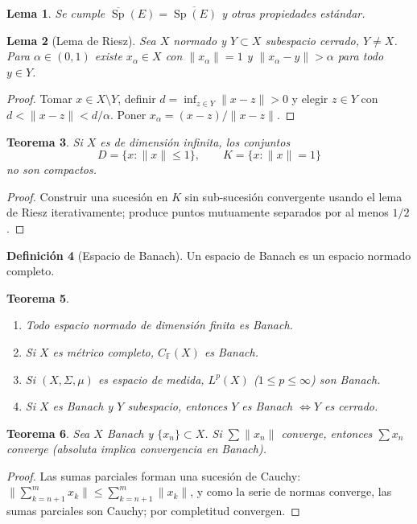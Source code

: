 \documentclass[11pt]{article}
\theoremstyle{definition}
\newtheorem{definition}{Definición}[section]
\theoremstyle{plain}
\newtheorem{lemma}[definition]{Lema}
\newtheorem{theorem}[definition]{Teorema}
\begin{document}
\begin{lemma}
Se cumple $\overline{\operatorname{Sp}}(E)=\overline{\operatorname{Sp}(E)}$ y otras propiedades estándar.
\end{lemma}

\begin{lemma}[Lema de Riesz]
Sea $X$ normado y $Y\subset X$ subespacio cerrado, $Y\ne X$. Para $\alpha\in(0,1)$ existe $x_\alpha\in X$ con $\|x_\alpha\|=1$ y $\|x_\alpha-y\|>\alpha$ para todo $y\in Y$.
\end{lemma}
\begin{proof}
Tomar $x\in X\setminus Y$, definir $d=\inf_{z\in Y}\|x-z\|>0$ y elegir $z\in Y$ con $d<\|x-z\|<d/\alpha$. Poner $x_\alpha=(x-z)/\|x-z\|$.
\end{proof}

\begin{theorem}
Si $X$ es de dimensión infinita, los conjuntos
$$D=\{x:\|x\|\le1\},\qquad K=\{x:\|x\|=1\}$$
no son compactos.
\end{theorem}
\begin{proof}
Construir una sucesión en $K$ sin sub-sucesión convergente usando el lema de Riesz iterativamente; produce puntos mutuamente separados por al menos $1/2$.
\end{proof}

\begin{definition}[Espacio de Banach]
Un espacio de Banach es un espacio normado completo.
\end{definition}

\begin{theorem}
\begin{enumerate}[label=(\arabic*)]
\item Todo espacio normado de dimensión finita es Banach.
\item Si $X$ es métrico completo, $C_\mathbb{F}(X)$ es Banach.
\item Si $(X,\Sigma,\mu)$ es espacio de medida, $L^p(X)$ ($1\le p\le\infty$) son Banach.
\item Si $X$ es Banach y $Y$ subespacio, entonces $Y$ es Banach $\iff Y$ es cerrado.
\end{enumerate}
\end{theorem}

\begin{theorem}
Sea $X$ Banach y $\{x_n\}\subset X$. Si $\sum\|x_n\|$ converge, entonces $\sum x_n$ converge (absoluta implica convergencia en Banach).
\end{theorem}
\begin{proof}
Las sumas parciales forman una sucesión de Cauchy: $\|\sum_{k=n+1}^m x_k\|\le\sum_{k=n+1}^m\|x_k\|$, y como la serie de normas converge, las sumas parciales son Cauchy; por completitud convergen.
\end{proof}
\end{document}
